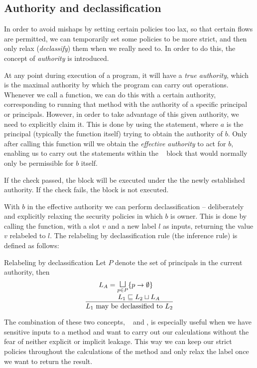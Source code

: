 \subsection{Authority and declassification}\label{dlm:auth_and_declass}
In order to avoid mishaps by setting certain policies too lax, so that certain flows are permitted, we can temporarily set some policies to be more strict, and then only relax (\emph{declassify}) them when we really need to.
In order to do this, the concept of \emph{authority} is introduced.

At any point during execution of a program, it will have a \emph{true authority}, which is the maximal authority by which the program can carry out operations.
Whenever we call a function, we can do this with a certain authority, corresponding to running that method with the authority of a specific principal or principals.
However, in order to take advantage of this given authority, we need to explicitly claim it.
This is done by using the \dlmactsfor{} statement, where $a$ is the principal (typically the function itself) trying to obtain the authority of $b$.
Only after calling this function will we obtain the \emph{effective authority} to act for $b$, enabling us to carry out the statements within the \dlmactsfor~ block that would normally only be permissible for $b$ itself.

If the check passed, the  block will be executed under the the newly established authority.
If the check fails, the block is not executed.

With $b$ in the effective authority we can perform declassification -- deliberately and explicitly relaxing the security policies in which $b$ is owner.
This is done by calling the \dlmdeclassify{} function, with a slot $v$ and a new label $l$ as inputs, returning the value $v$ relabeled to $l$.
The relabeling by declassification rule (the inference rule) is defined as follows:

\begin{definition}{Relabeling by declassification}
  Let $P$ denote the set of principals in the current authority, then
  \[
  \frac
  {
    \splitfrac
    {
      L_A = \mathlarger\sqcupl_{p \in P} \{p \rightarrow \emptyset \}
    }
    {
      L_1 \sqsubseteq L_2 \sqcup L_A
    }
  }
  {
    L_1 \text{ may be declassified to } L_2
  }
  \]
\end{definition}

The combination of these two concepts, \dlmactsfor~ and \dlmdeclassify, is especially useful when we have sensitive inputs to a method and want to carry out our calculations without the fear of neither explicit or implicit leakage.
This way we can keep our strict policies throughout the calculations of the method and only relax the label once we want to return the result.

